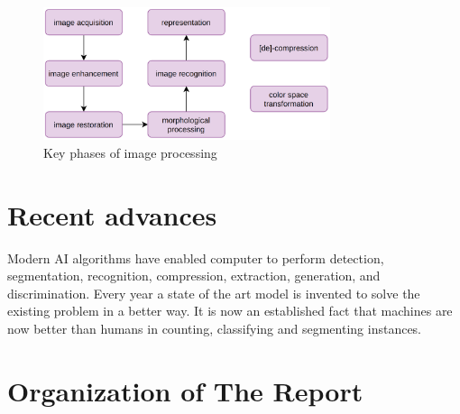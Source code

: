 \begin{figure}[!ht]
    \centering
    \includegraphics[width=0.75\textwidth]{fig/1-2.png}
    \caption{Key phases of image processing}
    \label{fig:keyPhasesOfImageProcessing}
\end{figure}

\section{Recent advances}

Modern AI algorithms have enabled computer to perform detection, segmentation, recognition, compression, extraction, generation, and discrimination. Every year a state of the art model is invented to solve the existing problem in a better way. It is now an established fact that machines are now better than humans in counting, classifying and segmenting instances. 

\section{Organization of The Report}

